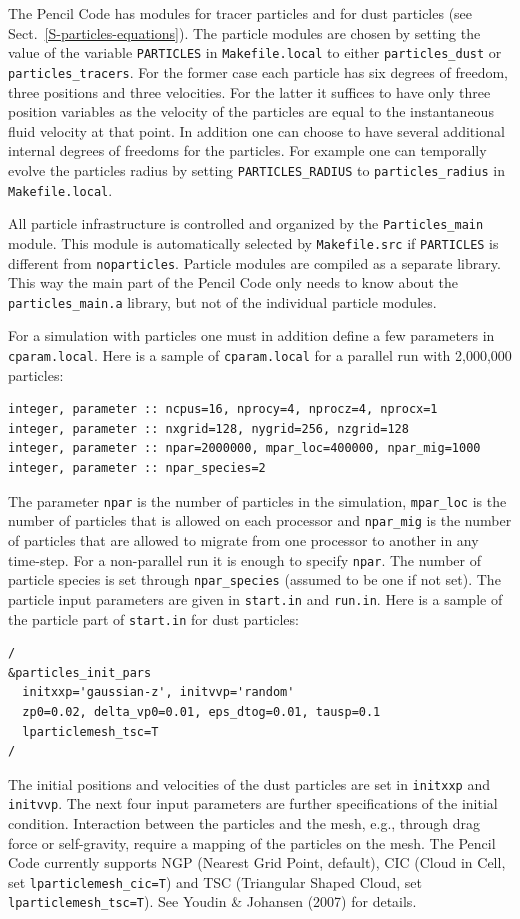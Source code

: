 \documentclass[\mydriver,12pt,twoside,notitlepage,a4paper]{article}
\newcommand{\code}[1]{\texttt{#1}}
\begin{document}
The {\sc Pencil Code} has modules for tracer particles and for dust particles
(see Sect.~\ref{S-particles-equations}). The particle modules are chosen by
setting the value of the variable \code{PARTICLES} in \code{Makefile.local} to
either \code{particles_dust} or \code{particles_tracers}. For the former case
each particle has six degrees of freedom, three positions and three
velocities. For the latter it suffices to have only three position variables
as the velocity of the particles are equal to the instantaneous fluid velocity
at that point. In addition one can choose to have several additional internal
degrees of freedoms for the particles. For example one can temporally evolve
the particles radius by setting \code{PARTICLES_RADIUS} to
\code{particles_radius} in \code{Makefile.local}.

All particle infrastructure is controlled and organized by the
\code{Particles_main} module. This module is automatically selected by
\code{Makefile.src} if \code{PARTICLES} is different from \code{noparticles}.
Particle modules are compiled as a separate library. This way the main part of
the Pencil Code only needs to know about the \code{particles_main.a} library,
but not of the individual particle modules.

For a simulation with particles one must in addition define a few parameters in
\code{cparam.local}. Here is a sample of \code{cparam.local} for a parallel run
with 2,000,000 particles:
\begin{verbatim}
integer, parameter :: ncpus=16, nprocy=4, nprocz=4, nprocx=1
integer, parameter :: nxgrid=128, nygrid=256, nzgrid=128
integer, parameter :: npar=2000000, mpar_loc=400000, npar_mig=1000
integer, parameter :: npar_species=2
\end{verbatim}
The parameter \code{npar} is the number of particles in the simulation,
\code{mpar_loc} is the number of particles that is allowed on each processor
and \code{npar_mig} is the number of particles that are allowed to migrate from
one processor to another in any time-step. For a non-parallel run it is enough
to specify \code{npar}. The number of particle species is set through
\code{npar_species} (assumed to be one if not set). The particle input
parameters are given in \code{start.in} and \code{run.in}. Here is a sample of
the particle part of \code{start.in} for dust particles:
\begin{verbatim}
/
&particles_init_pars
  initxxp='gaussian-z', initvvp='random'
  zp0=0.02, delta_vp0=0.01, eps_dtog=0.01, tausp=0.1
  lparticlemesh_tsc=T
/
\end{verbatim}
The initial positions and velocities of the dust particles are set in
\code{initxxp} and \code{initvvp}. The next four input parameters are further
specifications of the initial condition. Interaction between the particles and
the mesh, e.g., through drag force or self-gravity, require a mapping of the
particles on the mesh. The {\sc Pencil Code} currently supports NGP (Nearest
Grid Point, default), CIC (Cloud in Cell, set \code{lparticlemesh_cic=T}) and
TSC (Triangular Shaped Cloud, set \code{lparticlemesh_tsc=T}). See Youdin \&
Johansen (2007) for details.
\end{document}
